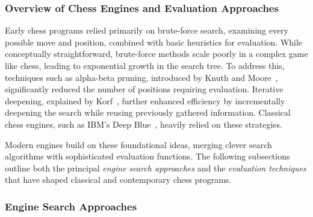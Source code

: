 \documentclass[12pt,a4paper]{article}
\begin{document}
\subsubsection{Overview of Chess Engines and Evaluation Approaches}
Early chess programs relied primarily on brute-force search, examining every possible move and position, combined with basic heuristics for evaluation. While conceptually straightforward, brute-force methods scale poorly in a complex game like chess, leading to exponential growth in the search tree. To address this, techniques such as alpha-beta pruning, introduced by Knuth and Moore~\cite{Knuth1975}, significantly reduced the number of positions requiring evaluation. Iterative deepening, explained by Korf~\cite{Korf1985}, further enhanced efficiency by incrementally deepening the search while reusing previously gathered information. Classical chess engines, such as IBM’s Deep Blue~\cite{Campbell2002DeepBlue}, heavily relied on these strategies. 

Modern engines build on these foundational ideas, merging clever search algorithms with sophisticated evaluation functions. The following subsections outline both the principal \emph{engine search approaches} and the \emph{evaluation techniques} that have shaped classical and contemporary chess programs.

\subsubsection{Engine Search Approaches}
\label{sec:engine_search_approaches}
\end{document}
